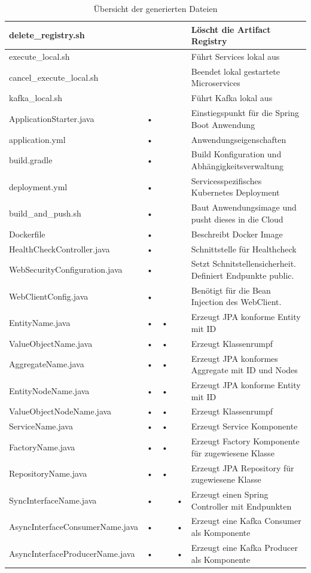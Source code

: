 \begin{table}[h]
\begin{tabularx}{\textwidth}{ | l | c | c | c | X | }
\hline
delete_registry.sh &  &  &  & Löscht die Artifact Registry \\ 
\hline
execute_local.sh &  &  &  & Führt Services lokal aus \\ 
\hline
cancel_execute_local.sh &  &  &  & Beendet lokal gestartete Microservices \\ 
\hline
kafka_local.sh &  &  &  & Führt Kafka lokal aus \\
\hline
ApplicationStarter.java & • &  &  & Einstiegspunkt für die Spring Boot Anwendung \\ 
\hline
application.yml & • &  &  & Anwendungseigenschaften \\
\hline
build.gradle & • &  &  & Build Konfiguration und Abhängigkeitsverwaltung \\
\hline
deployment.yml & • &  &  & Servicesspezifisches Kubernetes Deployment \\
\hline
build_and_push.sh & • &  &  & Baut Anwendungsimage und pusht dieses in die Cloud \\
\hline
Dockerfile & • &  &  & Beschreibt Docker Image \\
\hline
HealthCheckController.java & • &  &  & Schnittstelle für Healthcheck \\
\hline
WebSecurityConfiguration.java & • &  &  & Setzt Schnitstellensicherheit. Definiert Endpunkte public. \\
\hline
WebClientConfig.java & • &  &  & Benötigt für die Bean Injection des WebClient. \\
\hline
EntityName.java & • & • &  & Erzeugt JPA konforme Entity mit ID \\
\hline
ValueObjectName.java & • & • &  & Erzeugt Klassenrumpf \\
\hline
AggregateName.java & • & • &  & Erzeugt JPA konformes Aggregate mit ID und Nodes \\
\hline
EntityNodeName.java & • & • &  & Erzeugt JPA konforme Entity mit ID  \\
\hline
ValueObjectNodeName.java & • & • &  & Erzeugt Klassenrumpf \\
\hline
ServiceName.java & • & • &  & Erzeugt Service Komponente \\
\hline
FactoryName.java & • & • &  & Erzeugt Factory Komponente für zugewiesene Klasse \\
\hline
RepositoryName.java & • & • &  & Erzeugt JPA Repository für zugewiesene Klasse \\
\hline
SyncInterfaceName.java & • &  & • & Erzeugt einen Spring Controller mit Endpunkten \\
\hline
AsyncInterfaceConsumerName.java & • & & • & Erzeugt eine Kafka Consumer als Komponente \\
\hline
AsyncInterfaceProducerName.java & • & & • & Erzeugt eine Kafka Producer als Komponente \\
\hline
\end{tabularx}
\caption{Übersicht der generierten Dateien}
\end{table}

